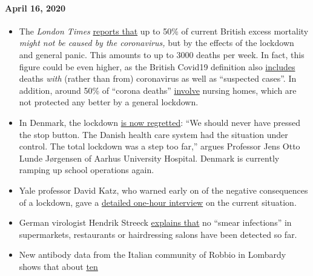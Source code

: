 \hypertarget{april-16-2020}{%
\paragraph{April 16, 2020}\label{april-16-2020}}

\begin{itemize}
\tightlist
\item
  The \emph{London Times}
  \href{https://www.thetimes.co.uk/edition/news/coronavirus-record-weekly-death-toll-as-fearful-patients-avoid-hospitals-bm73s2tw3}{reports
  that} up to 50\% of current British excess mortality \emph{might not
  be caused by the coronavirus,} but by the effects of the lockdown and
  general panic. This amounts to up to 3000 deaths per week. In fact,
  this figure could be even higher, as the British Covid19 definition
  also
  \href{https://www.ons.gov.uk/peoplepopulationandcommunity/birthsdeathsandmarriages/deaths/bulletins/deathsregisteredweeklyinenglandandwalesprovisional/weekending3april2020}{includes}
  deaths \emph{with} (rather than from) coronavirus as well as
  ``suspected cases''. In addition, around 50\% of ``corona deaths''
  \href{https://ltccovid.org/2020/04/12/mortality-associated-with-covid-19-outbreaks-in-care-homes-early-international-evidence/}{involve}
  nursing homes, which are not protected any better by a general
  lockdown.
\item
  In Denmark, the lockdown
  \href{https://jyllands-posten.dk/debat/breve/ECE12074246/vi-skulle-aldrig-have-trykket-paa-stopknappen/}{is
  now regretted}: ``We should never have pressed the stop button. The
  Danish health care system had the situation under control. The total
  lockdown was a step too far,'' argues Professor Jens Otto Lunde
  Jørgensen of Aarhus University Hospital. Denmark is currently ramping
  up school operations again.
\item
  Yale professor David Katz, who warned early on of the negative
  consequences of a lockdown, gave a
  \href{https://www.youtube.com/watch?v=VK0Wtjh3HVA}{detailed one-hour
  interview} on the current situation.
\item
  German virologist Hendrik Streeck
  \href{https://today.rtl.lu/news/science-and-environment/a/1498185.html}{explains
  that} no ``smear infections'' in supermarkets, restaurants or
  hairdressing salons have been detected so far.
\item
  New antibody data from the Italian community of Robbio in Lombardy
  shows that about
  \href{https://www.tgcom24.mediaset.it/cronaca/a-robbio-pv-il-22-ha-o-ha-avuto-il-coronavirus-ok-del-sindaco-ai-test-per-tutti_17285128-202002a.shtml}{ten
}
\end{itemize}
